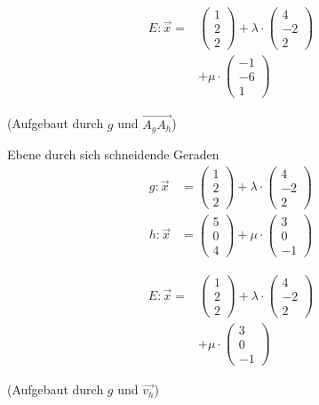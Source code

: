 \begin{antwort}\begin{align*}
	E:\vec{x}=&\left(\begin{array}{c} 1 \\ 2 \\ 2\end{array} \right)+\lambda \cdot \left(\begin{array}{c} 4 \\ -2 \\ 2\end{array} \right)\\
	&+\mu \cdot \left(\begin{array}{c} -1 \\-6 \\ 1\end{array} \right)
	\end{align*}
	\begin{center}
	(Aufgebaut durch $g$ und $\vec{A_gA_h}$)
	\end{center}\end{antwort}
\begin{frage}\LARGE
	Ebene durch sich schneidende Geraden
	\large
	\begin{align*}
	g:\vec{x}&=\left(\begin{array}{c} 1 \\ 2 \\ 2\end{array} \right)+\lambda \cdot \left(\begin{array}{c} 4 \\ -2 \\ 2\end{array} \right)\\
	h:\vec{x}&=\left(\begin{array}{c} 5 \\ 0 \\ 4\end{array} \right)+\mu \cdot \left(\begin{array}{c} 3 \\ 0 \\ -1\end{array} \right)
	\end{align*}\end{frage}
\begin{antwort}\begin{align*}
	E:\vec{x}=&\left(\begin{array}{c} 1 \\ 2 \\ 2\end{array} \right)+\lambda \cdot \left(\begin{array}{c} 4 \\ -2 \\ 2\end{array} \right)\\
	&+\mu \cdot \left(\begin{array}{c} 3 \\0 \\ -1\end{array} \right)
	\end{align*}
	\begin{center}
	(Aufgebaut durch $g$ und $\vec{v_h}$)
	\end{center}\end{antwort}
